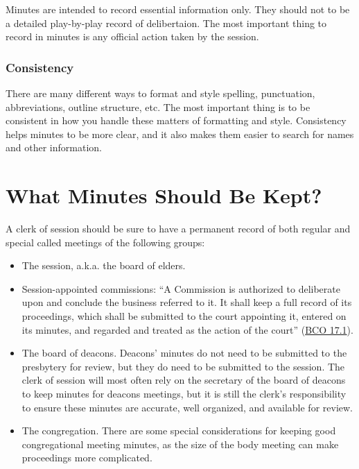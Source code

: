 \documentclass[
]{book}
\providecommand{\tightlist}{%
  \setlength{\itemsep}{0pt}\setlength{\parskip}{0pt}}
\begin{document}
Minutes are intended to record essential information only. They should not to be a detailed play-by-play record of delibertaion. The most important thing to record in minutes is any official action taken by the session.

\hypertarget{consistency}{%
\subsubsection{Consistency}\label{consistency}}

There are many different ways to format and style spelling, punctuation, abbreviations, outline structure, etc. The most important thing is to be consistent in how you handle these matters of formatting and style. Consistency helps minutes to be more clear, and it also makes them easier to search for names and other information.

\hypertarget{what-minutes-should-be-kept}{%
\section{What Minutes Should Be Kept?}\label{what-minutes-should-be-kept}}

A clerk of session should be sure to have a permanent record of both regular and special called meetings of the following groups:

\begin{itemize}
\tightlist
\item
  The session, a.k.a. the board of elders.
\item
  Session-appointed commissions: ``A Commission is authorized to deliberate upon and conclude the business referred to it. It shall keep a full record of its proceedings, which shall be submitted to the court appointing it, entered on its minutes, and regarded and treated as the action of the court'' (\href{https://evangel.pressbooks.com/chapter/17-ecclesiastical-commissions/}{BCO 17.1}).
\item
  The board of deacons. Deacons' minutes do not need to be submitted to the presbytery for review, but they do need to be submitted to the session. The clerk of session will most often rely on the secretary of the board of deacons to keep minutes for deacons meetings, but it is still the clerk's responsibility to ensure these minutes are accurate, well organized, and available for review.
\item
  The congregation. There are some special considerations for keeping good congregational meeting minutes, as the size of the body meeting can make proceedings more complicated.
\end{itemize}
\end{document}
